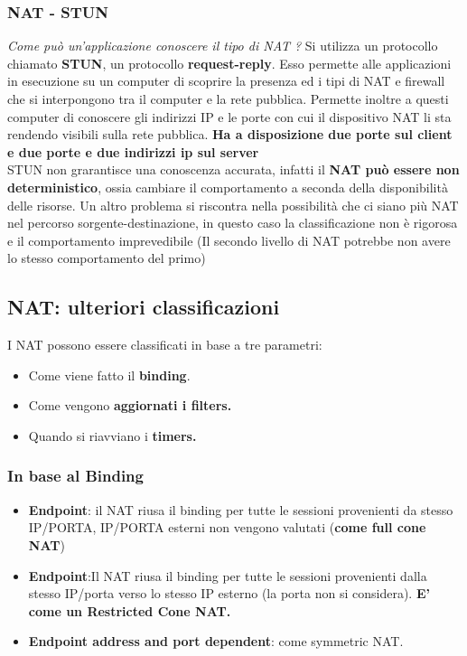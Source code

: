 \documentclass[12pt]{article}
\begin{document}
			 \subsubsection{NAT - STUN}
			 	\textit{Come può un'applicazione conoscere il tipo di NAT ?}\newline
			 	Si utilizza un protocollo chiamato \textbf{STUN}, un protocollo \textbf{request-reply}. Esso permette alle applicazioni in esecuzione su un computer di scoprire la presenza ed i tipi di NAT e firewall che si interpongono tra il computer e la rete pubblica. Permette inoltre a questi computer di conoscere gli indirizzi IP e le porte con cui il dispositivo NAT li sta rendendo visibili sulla rete pubblica. \textbf{Ha a disposizione due porte sul client e due porte e due indirizzi ip sul server}\\
			 	STUN non grarantisce una conoscenza accurata, infatti il \textbf{NAT può essere non deterministico}, ossia cambiare il comportamento a seconda della disponibilità delle risorse. Un altro problema si riscontra nella possibilità che ci siano più NAT nel percorso sorgente-destinazione, in questo caso la classificazione non è rigorosa e il comportamento imprevedibile (Il secondo livello di NAT potrebbe non avere lo stesso comportamento del primo)
		\subsection{NAT: ulteriori classificazioni}
			I NAT possono essere classificati in base a tre parametri:
			\begin{itemize}
				\item Come viene fatto il \textbf{binding}.
				\item Come vengono \textbf{aggiornati i filters.}
				\item Quando si riavviano i \textbf{timers.}
			\end{itemize}
			\subsubsection{In base al Binding}
				\begin{itemize}
					\item \textbf{Endpoint}: il NAT riusa il binding per tutte le sessioni provenienti da stesso IP/PORTA, IP/PORTA esterni non vengono valutati (\textbf{come full cone NAT})
					\item \textbf{Endpoint}:Il NAT riusa il binding per tutte le sessioni provenienti dalla stesso IP/porta verso lo stesso IP esterno (la porta non si considera).
					\textbf{E’ come un Restricted Cone NAT.}
					\item \textbf{Endpoint address and port dependent}: come symmetric NAT.  	
				\end{itemize}
\end{document}
